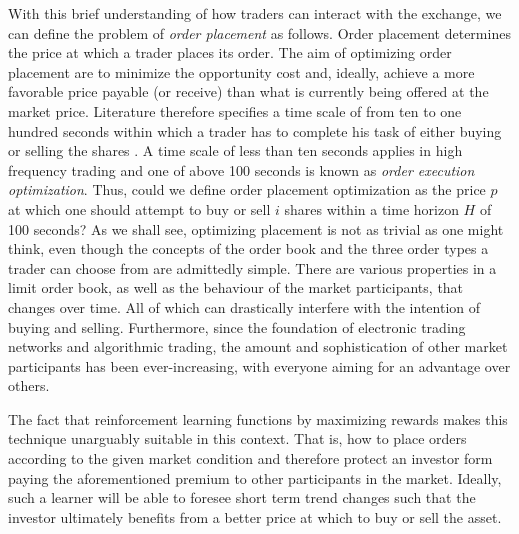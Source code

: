 With this brief understanding of how traders can interact with the exchange, we can define the problem of \textit{order placement} as follows.
Order placement determines the price at which a trader places its order.
The aim of optimizing order placement are to minimize the opportunity cost and, ideally, achieve a more favorable price payable (or receive) than what is currently being offered at the market price.
Literature therefore specifies a time scale of from ten to one hundred seconds within which a trader has to complete his task of either buying or selling the shares \cite{guo2013optimal}.
A time scale of less than ten seconds applies in high frequency trading and one of above 100 seconds is known as \textit{order execution optimization}.
Thus, could we define order placement optimization as the price $p$ at which one should attempt to buy or sell $i$ shares within a time horizon $H$ of 100 seconds?
As we shall see, optimizing placement is not as trivial as one might think, even though the concepts of the order book and the three order types a trader can choose from are admittedly simple.
There are various properties in a limit order book, as well as the behaviour of the market participants, that changes over time.
All of which can drastically interfere with the intention of buying and selling.
Furthermore, since the foundation of electronic trading networks and algorithmic trading, the amount and sophistication of other market participants has been ever-increasing, with everyone aiming for an advantage over others.
%

The fact that reinforcement learning functions by maximizing rewards makes this technique unarguably suitable in this context.
That is, how to place orders according to the given market condition and therefore protect an investor form paying the aforementioned premium to other participants in the market.
Ideally, such a learner will be able to foresee short term trend changes such that the investor ultimately benefits from a better price at which to buy or sell the asset. 

